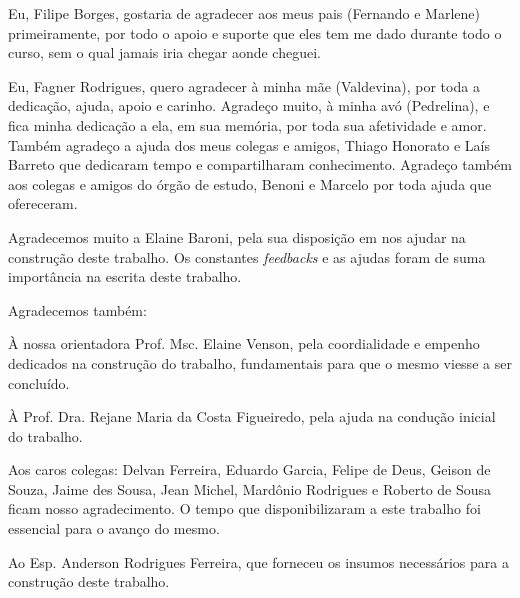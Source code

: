 \begin{agradecimentos}
\begin{comment}
A inclusão desta seção de agradecimentos é opcional, portanto, sua inclusão 
fica a critério do(s) autor(es), que caso deseje(em) fazê-lo deverá(ão) 
utilizar este espaço, seguindo a formatação de \textit{espaço simples e 
fonte padrão do texto (arial ou times, tamanho 12 sem negritos, aspas ou 
itálico}.
\end{comment}

Eu, Filipe Borges, gostaria de agradecer aos meus pais (Fernando e Marlene) primeiramente, por todo o apoio e suporte que eles tem me dado durante todo o curso, sem o qual jamais iria chegar aonde cheguei.

Eu, Fagner Rodrigues, quero agradecer à minha mãe (Valdevina), por toda a dedicação, ajuda, apoio e carinho. Agradeço muito, à minha avó (Pedrelina), e fica minha dedicação a ela, em sua memória, por toda sua afetividade e amor. Também agradeço a ajuda dos meus colegas e amigos, Thiago Honorato e Laís Barreto que dedicaram tempo e compartilharam conhecimento. Agradeço também aos colegas e amigos do órgão de estudo, Benoni e Marcelo por toda ajuda que ofereceram.

Agradecemos muito a Elaine Baroni, pela sua disposição em nos ajudar na construção deste trabalho. Os constantes \textit{feedbacks} e as ajudas foram de suma importância na escrita deste trabalho.

Agradecemos também:

À nossa orientadora Prof. Msc. Elaine Venson, pela coordialidade e empenho dedicados na construção do trabalho, fundamentais para que o mesmo viesse a ser concluído.

À Prof. Dra. Rejane Maria da Costa Figueiredo, pela ajuda na condução inicial do trabalho.

Aos caros colegas: Delvan Ferreira, Eduardo Garcia, Felipe de Deus, Geison de Souza, Jaime des Sousa, Jean Michel, Mardônio Rodrigues e Roberto de Sousa ficam nosso agradecimento. O tempo que disponibilizaram a este trabalho foi essencial para o avanço do mesmo.

Ao Esp. Anderson Rodrigues Ferreira, que forneceu os insumos necessários para a construção deste trabalho.

\end{agradecimentos}
